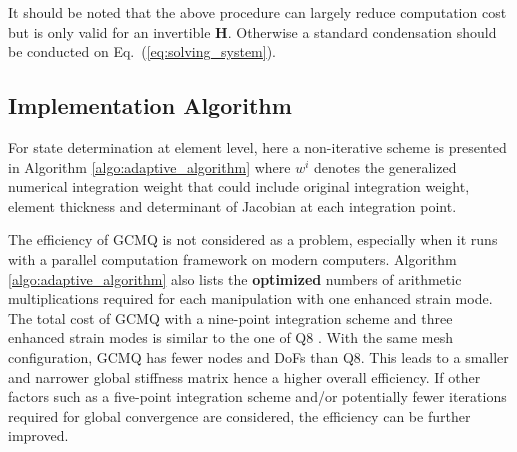 \documentclass[3p,sort&compress,review,11pt]{elsarticle}
\newcommand*{\eqsref}[1]{Eq.~(\ref{#1})}
\newcommand*{\mb}{\bm}
\begin{document}
It should be noted that the above procedure can largely reduce computation cost but is only valid for an invertible $\mb{H}$. Otherwise a standard condensation should be conducted on \eqsref{eq:solving_system}.
\subsection{Implementation Algorithm}
For state determination at element level, here a non-iterative scheme is presented in Algorithm \ref{algo:adaptive_algorithm} where $w^i$ denotes the generalized numerical integration weight that could include original integration weight, element thickness and determinant of Jacobian at each integration point.

The efficiency of GCMQ is not considered as a problem, especially when it runs with a parallel computation framework on modern computers. Algorithm \ref{algo:adaptive_algorithm} also lists the \textbf{optimized} numbers of arithmetic multiplications required for each manipulation with one enhanced strain mode. The total cost of GCMQ with a nine-point integration scheme and three enhanced strain modes is similar to the one of Q8 \citep{Ergatoudis1968}. With the same mesh configuration, GCMQ has fewer nodes and DoFs than Q8. This leads to a smaller and narrower global stiffness matrix hence a higher overall efficiency. If other factors such as a five-point integration scheme and/or potentially fewer iterations required for global convergence are considered, the efficiency can be further improved.
\end{document}
